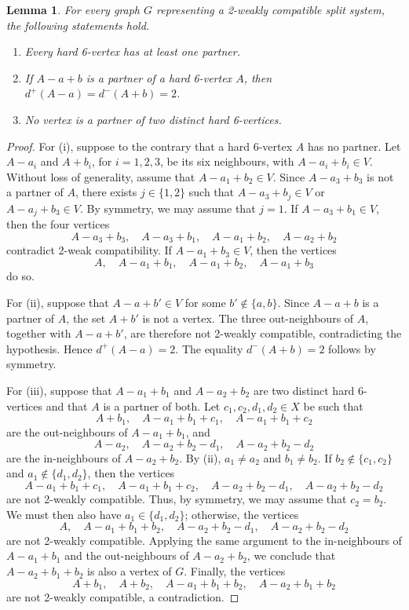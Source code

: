 \documentclass[11pt]{article}
\newtheorem{lemma}{Lemma}
\begin{document}
	\begin{lemma}\label{lem:hard-partners}
		For every graph $G$ representing a 2-weakly compatible split system, the following statements hold.
		\begin{enumerate}[label=(\roman*)]
			\item Every hard 6-vertex has at least one partner.
			\item If $A-a+b$ is a partner of a hard 6-vertex $A$, then $d^+(A-a)=d^-(A+b)=2$.
			\item No vertex is a partner of two distinct hard 6-vertices.
		\end{enumerate}
	\end{lemma}
	
	\begin{proof}
		For (i), suppose to the contrary that a hard 6-vertex $A$ has no partner. Let $A-a_i$ and $A+b_i$, for $i=1,2,3$, be its six neighbours, with $A-a_i+b_i\in V$. Without loss of generality, assume that $A-a_1+b_2\in V$. Since $A-a_3+b_3$ is not a partner of $A$, there exists $j\in\{1,2\}$ such that $A-a_3+b_j\in V$ or $A-a_j+b_3\in V$. By symmetry, we may assume that $j=1$. If $A-a_3+b_1\in V$, then the four vertices
		\[
		A-a_3+b_3,\quad A-a_3+b_1,\quad A-a_1+b_2,\quad A-a_2+b_2
		\]
		contradict 2-weak compatibility. If $A-a_1+b_3\in V$, then the vertices
		\[
		A,\quad A-a_1+b_1,\quad A-a_1+b_2,\quad A-a_1+b_3
		\]
		do so.
		
		For (ii), suppose that $A-a+b'\in V$ for some $b'\notin\{a,b\}$. Since $A-a+b$ is a partner of $A$, the set $A+b'$ is not a vertex. The three out-neighbours of $A$, together with $A-a+b'$, are therefore not 2-weakly compatible, contradicting the hypothesis. Hence $d^+(A-a)=2$. The equality $d^-(A+b)=2$ follows by symmetry.
		
		For (iii), suppose that $A-a_1+b_1$ and $A-a_2+b_2$ are two distinct hard 6-vertices and that $A$ is a partner of both. Let $c_1,c_2,d_1,d_2\in X$ be such that
		\[
		A+b_1,\quad A-a_1+b_1+c_1,\quad A-a_1+b_1+c_2
		\]
		are the out-neighbours of $A-a_1+b_1$, and
		\[
		A-a_2,\quad A-a_2+b_2-d_1,\quad A-a_2+b_2-d_2
		\]
		are the in-neighbours of $A-a_2+b_2$. By (ii), $a_1\ne a_2$ and $b_1\ne b_2$. If $b_2\notin\{c_1,c_2\}$ and $a_1\notin\{d_1,d_2\}$, then the vertices
		\[
		A-a_1+b_1+c_1,\quad A-a_1+b_1+c_2,\quad A-a_2+b_2-d_1,\quad A-a_2+b_2-d_2
		\]
		are not 2-weakly compatible. Thus, by symmetry, we may assume that $c_2=b_2$. We must then also have $a_1\in\{d_1,d_2\}$; otherwise, the vertices
		\[
		A,\quad A-a_1+b_1+b_2,\quad A-a_2+b_2-d_1,\quad A-a_2+b_2-d_2
		\]
		are not 2-weakly compatible. Applying the same argument to the in-neighbours of $A-a_1+b_1$ and the out-neighbours of $A-a_2+b_2$, we conclude that $A-a_2+b_1+b_2$ is also a vertex of $G$. Finally, the vertices
		\[
		A+b_1,\quad A+b_2,\quad A-a_1+b_1+b_2,\quad A-a_2+b_1+b_2
		\]
		are not 2-weakly compatible, a contradiction.
	\end{proof}
	
\end{document}

